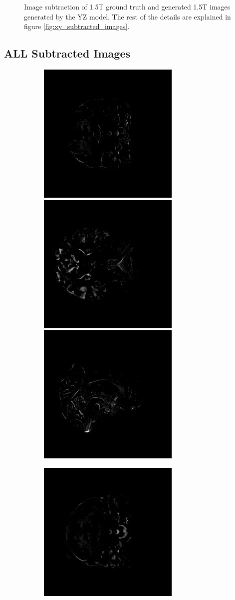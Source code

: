 \documentclass[11pt, fleqn, titlepage]{article}
\newcommand\skipperer{0.45pt}
\newcommand\ripperer{1.25pt}
\newcommand{\1}[1]{\mathds{1}\left[#1\right]}
\begin{document}
\begin{figure}[H]
\begin{subfigure}[b]{0.8\textwidth}
	\end{subfigure}
	\caption{Image subtraction of 1.5T ground truth and generated 1.5T images generated by the YZ model. The rest of the details are explained in figure \ref{fig:xy_subtracted_images}.}
	\label{fig:yz_subtracted_images}
\end{figure}

\subsection{ALL Subtracted Images}\label{all_subtracted_images}
\begin{figure}[H]
	\centering
	\begin{subfigure}[b]{0.8\textwidth}
		\centering
		\includegraphics[width=0.22\linewidth]{imgs/subtracted_images/all/002_S_0559_xy_gts_comparison}
		\hskip\skipperer
		\includegraphics[width=0.22\linewidth]{imgs/subtracted_images/all/002_S_0559_xz_gts_comparison}
		\hskip\skipperer
		\includegraphics[width=0.22\linewidth]{imgs/subtracted_images/all/002_S_0559_yz_gts_comparison}
	\end{subfigure}
	\vskip\ripperer
	\begin{subfigure}[b]{0.8\textwidth}
		\centering
		\includegraphics[width=0.22\linewidth]{imgs/subtracted_images/all/002_S_0559_xy_1.5_1.5gen_comparison}

\end{subfigure}
\end{figure}
\end{document}
